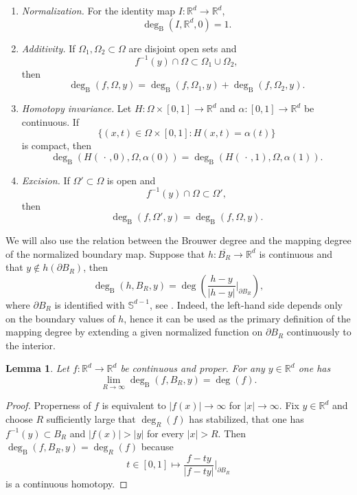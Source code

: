 \documentclass[12pt]{amsart}
\newtheorem{lemma}[theorem]{Lemma}
\newcommand{\RM}{{\mathbb R}}
\newcommand{\SM}{{\mathbb S}}
\newcommand{\pdv}{\partial}
\begin{document}
\begin{enumerate}
\item[(i)] \emph{Normalization.} For the identity map
$I:\RM^d\to\RM^d$,
\[
    \deg_{\mathrm B}(I,\RM^d,0)=1.
\]

\item[(ii)] \emph{Additivity.} If $\Omega_1,\Omega_2\subset\Omega$ are
disjoint open sets and
\[
    f^{-1}(y)\cap\Omega\subset\Omega_1\cup\Omega_2,
\]
then
\[
    \deg_{\mathrm B}(f,\Omega,y)
    =
    \deg_{\mathrm B}(f,\Omega_1,y)
    +
    \deg_{\mathrm B}(f,\Omega_2,y).
\]

\item[(iii)] \emph{Homotopy invariance.} Let
$H:\Omega\times[0,1]\to\RM^d$ and
$\alpha:[0,1]\to\RM^d$ be continuous. If
\[
    \bigl\{(x,t)\in\Omega\times[0,1]:
    H(x,t)=\alpha(t)\bigr\}
\]
is compact, then
\[
    \deg_{\mathrm B}(H(\,\cdot\,,0),\Omega,\alpha(0))
    =
    \deg_{\mathrm B}(H(\,\cdot\,,1),\Omega,\alpha(1)).
\]

\item[(iv)] \emph{Excision.} If $\Omega'\subset\Omega$ is open and
\[
    f^{-1}(y)\cap\Omega\subset\Omega',
\]
then
\[
    \deg_{\mathrm B}(f,\Omega',y)
    =
    \deg_{\mathrm B}(f,\Omega,y).
\]
\end{enumerate}

We will also use the relation between the Brouwer degree and the mapping
degree of the normalized boundary map. Suppose that
$h:\overline{B_R}\to\RM^d$ is continuous and that
$y\notin h(\pdv B_R)$, then
\begin{equation}\label{eq:brouwer_boundary_formula}
    \deg_{\mathrm B}(h,B_R,y)
    =
    \deg\left(
        \frac{h-y}{|h-y|}
        \bigg|_{\pdv B_R}
    \right),
\end{equation}
where $\pdv B_R$ is identified with $\SM^{d-1}$, see
\cite[Section IV.4]{OutereloRuiz2009}. Indeed, the left-hand side depends only on the boundary values of $h$, hence it can be used as the primary definition of the mapping degree by extending a given normalized function on $\pdv B_R$ continuously to the interior.

\begin{lemma}\label{lem:brouwer_asymptotic_degree}
Let $f:\RM^d\to\RM^d$ be continuous and proper. For any $y\in \RM^d$ one has
\[
    \lim_{R\to \infty}\deg_{\mathrm B}(f,B_R,y)=\deg(f).
\]
\end{lemma}

\begin{proof}
Properness of $f$ is equivalent to $|f(x)|\longrightarrow\infty$ for $|x|\to \infty$. 
Fix $y\in\RM^d$ and choose $R$ sufficiently large that $\deg_R(f)$ has stabilized, that one has $f^{-1}(y)\subset B_R$ and $|f(x)|>|y|$ for every $|x|>R$. Then $\deg_{\mathrm B}(f,B_R,y)=\deg_{R}(f)$ because
$$t\in [0,1]\mapsto \frac{f-ty}{|f-ty|}\bigg\rvert_{\pdv B_R}$$
is a continuous homotopy.
\end{proof}
\end{document}
